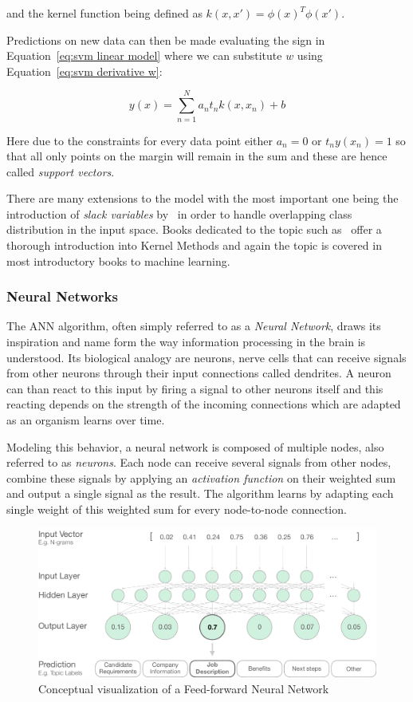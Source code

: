 and the kernel function being defined as $k(x, x') = \phi(x)^T \phi(x')$.

Predictions on new data can then be made evaluating the sign in Equation~\ref{eq:svm linear model} where we can substitute $w$ using Equation~\ref{eq:svm derivative w}:

\begin{equation}
	y(x) = \sum_{n=1}^N a_n t_n k(x, x_n) + b
\end{equation}

Here due to the constraints for every data point either $a_n = 0$ or $t_n y(x_n) = 1$ so that all only points on the margin will remain in the sum and these are hence called \emph{support vectors}.

There are many extensions to the model with the most important one being the introduction of \emph{slack variables} by~\cite{Cortes:aa} in order to handle overlapping class distribution in the input space. Books dedicated to the topic such as~\cite{Shawe-Taylor:2004aa} offer a thorough introduction into Kernel Methods and again the topic is covered in most introductory books to machine learning. 

\subsubsection{Neural Networks}
\label{subs:Neural Networks}

The \gls{ANN} algorithm, often simply referred to as a \emph{Neural Network}, draws its inspiration and name form the way information processing in the brain is understood. Its biological analogy are neurons, nerve cells that can receive signals from other neurons through their input connections called dendrites. A neuron can than react to this input by firing a signal to other neurons itself and this reacting depends on the strength of the incoming connections which are adapted as an organism learns over time.

Modeling this behavior, a neural network is composed of multiple nodes, also referred to as \emph{neurons}. Each node can receive several signals from other nodes, combine these signals by applying an \emph{activation function} on their weighted sum and output a single signal as the result. The algorithm learns by adapting each single weight of this weighted sum for every node-to-node connection.

\begin{figure}[h]
  \centering
  \includegraphics[width=1\textwidth]{img/NN}
  \caption{Conceptual visualization of a Feed-forward Neural Network}
  \label{fig:NN}
\end{figure}

